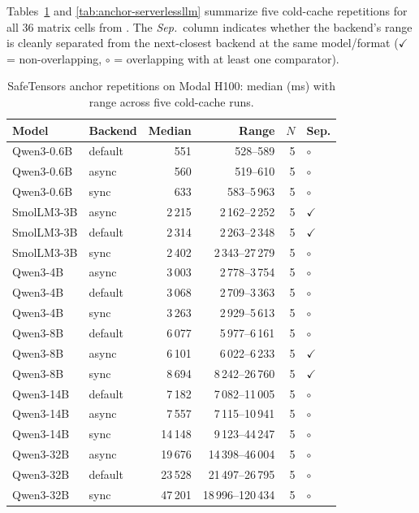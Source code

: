 Tables~\ref{tab:anchor-safetensors} and \ref{tab:anchor-serverlessllm} summarize five cold-cache repetitions for all 36 matrix cells from . The \emph{Sep.}\ column indicates whether the backend's range is cleanly separated from the next-closest backend at the same model/format ($\checkmark$ = non-overlapping, $\circ$ = overlapping with at least one comparator).

\begin{table}[htbp]
\centering
\small
\caption{SafeTensors anchor repetitions on Modal H100: median (ms) with range across five cold-cache runs.}
\label{tab:anchor-safetensors}
\begin{tabular}{llrrrl}
\toprule
Model & Backend & Median & Range & $N$ & Sep. \\
\midrule
Qwen3-0.6B & default & 551 & 528--589 & 5 & $\circ$ \\
Qwen3-0.6B & async & 560 & 519--610 & 5 & $\circ$ \\
Qwen3-0.6B & sync & 633 & 583--5\,963 & 5 & $\circ$ \\
\midrule
SmolLM3-3B & async & 2\,215 & 2\,162--2\,252 & 5 & $\checkmark$ \\
SmolLM3-3B & default & 2\,314 & 2\,263--2\,348 & 5 & $\checkmark$ \\
SmolLM3-3B & sync & 2\,402 & 2\,343--27\,279 & 5 & $\circ$ \\
\midrule
Qwen3-4B & async & 3\,003 & 2\,778--3\,754 & 5 & $\circ$ \\
Qwen3-4B & default & 3\,068 & 2\,709--3\,363 & 5 & $\circ$ \\
Qwen3-4B & sync & 3\,263 & 2\,929--5\,613 & 5 & $\circ$ \\
\midrule
Qwen3-8B & default & 6\,077 & 5\,977--6\,161 & 5 & $\circ$ \\
Qwen3-8B & async & 6\,101 & 6\,022--6\,233 & 5 & $\checkmark$ \\
Qwen3-8B & sync & 8\,694 & 8\,242--26\,760 & 5 & $\checkmark$ \\
\midrule
Qwen3-14B & default & 7\,182 & 7\,082--11\,005 & 5 & $\circ$ \\
Qwen3-14B & async & 7\,557 & 7\,115--10\,941 & 5 & $\circ$ \\
Qwen3-14B & sync & 14\,148 & 9\,123--44\,247 & 5 & $\circ$ \\
\midrule
Qwen3-32B & async & 19\,676 & 14\,398--46\,004 & 5 & $\circ$ \\
Qwen3-32B & default & 23\,528 & 21\,497--26\,795 & 5 & $\circ$ \\
Qwen3-32B & sync & 47\,201 & 18\,996--120\,434 & 5 & $\circ$ \\
\bottomrule
\end{tabular}
\end{table}

